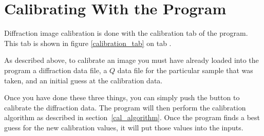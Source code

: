 \section{Calibrating With the Program}

Diffraction image calibration is done with the
calibration tab of the program. This tab is shown 
in figure \ref{calibration_tab} on tab
\pageref{calibration_tab}.

As described above, to calibrate an image
you must have already loaded into the program
a diffraction data file, a $Q$ data 
file for the particular sample that was
taken, and an initial guess at the calibration 
data.

Once you have done these three things, you can
simply push the  button to
calibrate the diffraction data. The program will
then perform the calibration algorithm as described
in section~\ref{cal_algorithm}. Once the program
finds a best guess for the new calibration
values, it will put those values into the inputs. 

